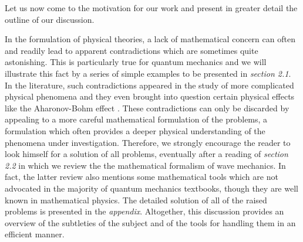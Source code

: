 \documentclass[12pt]{report}
\begin{document}
Let us now come to the motivation for our work and 
present in greater detail the outline of our discussion. 

\bigskip 


\medskip 

In the formulation of physical theories, 
a lack of mathematical concern can 
often and readily lead to apparent
contradictions which are sometimes quite 
astonishing. This is particularly true for quantum mechanics 
and we will illustrate this fact by 
a series of simple examples to be presented in {\em section 2.1}.   
In the literature, such contradictions appeared in the study 
of more complicated physical phenomena and they even brought into 
question certain physical effects like the Aharonov-Bohm
effect \cite{ab}.
These contradictions can only
be discarded by appealing to a more careful mathematical
formulation of the problems, a formulation which
often provides a deeper physical understanding
of the phenomena under investigation.
Therefore, we strongly encourage the reader to look himself 
for a solution 
of all problems, eventually after a reading of  
{\em section 2.2} in which we review the 
the mathematical formalism of wave mechanics. 
In fact, the latter review also mentions some 
mathematical tools 
which are not advocated in the majority of
 quantum mechanics textbooks, though they are 
well known in mathematical 
 physics. 
The detailed solution of all of the raised problems
 is presented in the {\em appendix}.
Altogether, this discussion 
provides an overview of the subtleties 
of the subject and of the tools for handling them 
in an efficient manner.

\bigskip 


\medskip 
\end{document}
